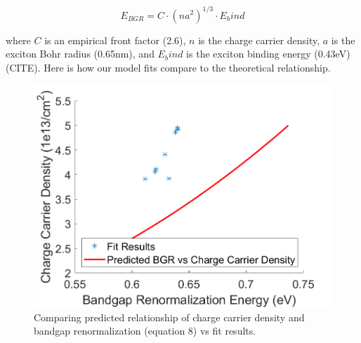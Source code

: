 \documentclass[aps,prb,preprint,groupedaddress]{revtex4-2}
\begin{document}
\begin{equation}
E_{BGR} = C \cdot (n a^2)^{1/3} \cdot E_bind
\end{equation}

where $C$ is an empirical front factor (2.6), $n$ is the charge carrier density, $a$ is the exciton Bohr radius (0.65nm), and $E_bind$ is the exciton binding energy (0.43eV) (CITE). Here is how our model fits compare to the theoretical relationship.

\begin{figure}[H]
	\begin{centering}
	\includegraphics[width=0.5\linewidth]{fig_nvsBGR.png}
	\caption{Comparing predicted relationship of charge carrier density and bandgap renormalization (equation 8) vs fit results.}
	\label{fig:nvsBGR}
	\end{centering}
\end{figure}



%

\end{document}
